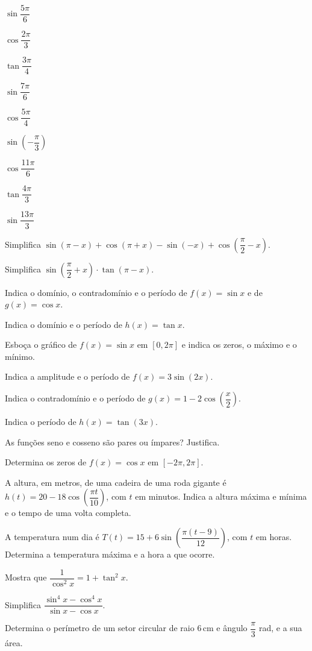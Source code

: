 \documentclass[12pt]{article}
\begin{document}
\begin{exercicios}
  \item $\sin \dfrac{5\pi}{6}$
  \item $\cos \dfrac{2\pi}{3}$
  \item $\tan \dfrac{3\pi}{4}$
  \item $\sin \dfrac{7\pi}{6}$
  \item $\cos \dfrac{5\pi}{4}$
  \item $\sin \left(-\dfrac{\pi}{3}\right)$
  \item $\cos \dfrac{11\pi}{6}$
  \item $\tan \dfrac{4\pi}{3}$
  \item $\sin \dfrac{13\pi}{3}$
  \item Simplifica $\sin(\pi - x) + \cos(\pi + x) - \sin(-x) + \cos\left(\dfrac{\pi}{2} - x\right)$.
  \item Simplifica $\sin\left(\dfrac{\pi}{2} + x\right) \cdot \tan(\pi - x)$.
\end{exercicios}

\begin{exercicios}
  \item Indica o domínio, o contradomínio e o período de $f(x) = \sin x$ e de $g(x) = \cos x$.
  \item Indica o domínio e o período de $h(x) = \tan x$.
  \item Esboça o gráfico de $f(x) = \sin x$ em $[0, 2\pi]$ e indica os zeros, o máximo e o mínimo.
  \item Indica a amplitude e o período de $f(x) = 3\sin(2x)$.
  \item Indica o contradomínio e o período de $g(x) = 1 - 2\cos\left(\dfrac{x}{2}\right)$.
  \item Indica o período de $h(x) = \tan(3x)$.
  \item As funções seno e cosseno são pares ou ímpares? Justifica.
  \item Determina os zeros de $f(x) = \cos x$ em $[-2\pi, 2\pi]$.
\end{exercicios}

\begin{exercicios}
  \item A altura, em metros, de uma cadeira de uma roda gigante é $h(t) = 20 - 18\cos\left(\dfrac{\pi t}{10}\right)$, com $t$ em minutos. Indica a altura máxima e mínima e o tempo de uma volta completa.
  \item A temperatura num dia é $T(t) = 15 + 6\sin\left(\dfrac{\pi (t - 9)}{12}\right)$, com $t$ em horas. Determina a temperatura máxima e a hora a que ocorre.
  \item Mostra que $\dfrac{1}{\cos^2 x} = 1 + \tan^2 x$.
  \item Simplifica $\dfrac{\sin^4 x - \cos^4 x}{\sin x - \cos x}$.
  \item Determina o perímetro de um setor circular de raio 6\,cm e ângulo $\dfrac{\pi}{3}$ rad, e a sua área.
\end{exercicios}
\end{document}
